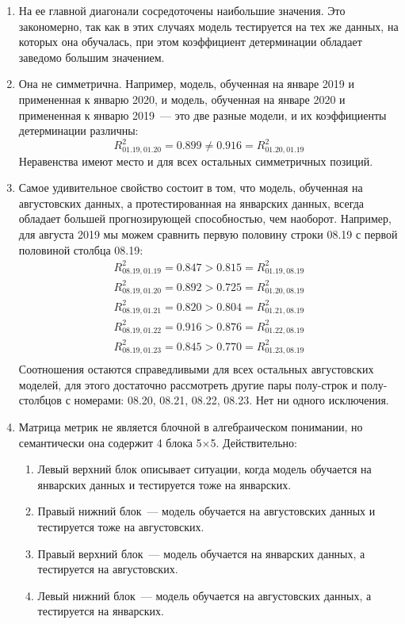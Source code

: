 \documentclass[a4paper,12pt]{article}
\begin{document}
\begin{enumerate}
	\item На ее главной диагонали сосредоточены наибольшие значения. Это закономерно, так как в этих случаях модель тестируется на тех же данных, на которых она обучалась,  при этом коэффициент детерминации обладает заведомо большим значением.
	\item Она не симметрична. Например, модель, обученная на январе 2019 и примененная к январю 2020, и модель, обученная на январе 2020 и примененная к январю 2019~--- это две разные модели, и их коэффициенты детерминации различны: 
	$$R^2_{01.19 , 01.20} = 0.899 \ne 0.916 = R^2_{01.20 , 01.19}$$
	Неравенства имеют место и для всех остальных симметричных позиций.
	\item Самое удивительное свойство состоит в том, что модель, обученная на августовских данных, а протестированная на январских данных, всегда обладает большей прогнозирующей способностью, чем наоборот. Например, для августа 2019 мы можем сравнить первую половину строки 08.19 с первой половиной столбца 08.19:
	$$
	\begin{array}{c}
	R^2_{08.19 , 01.19} = 0.847 > 0.815 = R^2_{01.19 , 08.19}  \\
	R^2_{08.19 , 01.20} = 0.892 > 0.725 = R^2_{01.20 , 08.19}  \\
	R^2_{08.19 , 01.21} = 0.820 > 0.804 = R^2_{01.21 , 08.19}  \\
	R^2_{08.19 , 01.22} = 0.916 > 0.876 = R^2_{01.22 , 08.19}  \\
	R^2_{08.19 , 01.23} = 0.845 > 0.770 = R^2_{01.23 , 08.19}  \\
	\end{array}
	$$
	Соотношения остаются справедливыми для всех остальных августовских моделей, для этого достаточно рассмотреть другие пары полу-строк и полу-столбцов с номерами: 08.20, 08.21, 08.22, 08.23. Нет ни одного исключения.
	\item Матрица метрик не является блочной в алгебраическом понимании, но семантически она содержит 4 блока 5×5. Действительно:
	\begin{enumerate}
		\item Левый верхний блок описывает ситуации, когда модель обучается на январских данных и тестируется тоже на январских.
		\item Правый нижний блок~--- модель обучается на августовских данных и тестируется тоже на августовских.
		\item Правый верхний блок~--- модель обучается на январских  данных, а тестируется на августовских.
		\item Левый нижний блок~--- модель обучается на августовских данных, а тестируется на январских.
	\end{enumerate}
\end{enumerate}
\end{document}
